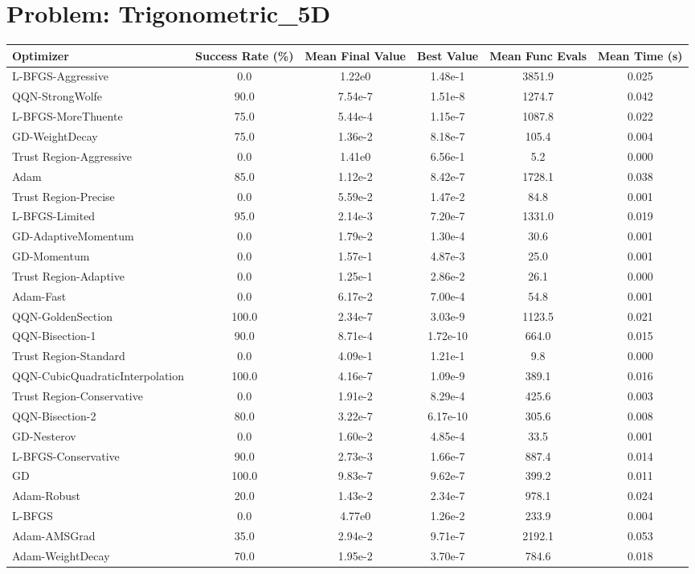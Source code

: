 \documentclass{article}
\begin{document}
\section{Problem: Trigonometric\_5D}
\begin{longtable}{p{3cm}*{5}{c}}
\toprule
\textbf{Optimizer} & \textbf{Success Rate (\%)} & \textbf{Mean Final Value} & \textbf{Best Value} & \textbf{Mean Func Evals} & \textbf{Mean Time (s)} \\
\midrule
L-BFGS-Aggressive & 0.0 & 1.22e0 & 1.48e-1 & 3851.9 & 0.025 \\
QQN-StrongWolfe & 90.0 & 7.54e-7 & 1.51e-8 & 1274.7 & 0.042 \\
L-BFGS-MoreThuente & 75.0 & 5.44e-4 & 1.15e-7 & 1087.8 & 0.022 \\
GD-WeightDecay & 75.0 & 1.36e-2 & 8.18e-7 & 105.4 & 0.004 \\
Trust Region-Aggressive & 0.0 & 1.41e0 & 6.56e-1 & 5.2 & 0.000 \\
Adam & 85.0 & 1.12e-2 & 8.42e-7 & 1728.1 & 0.038 \\
Trust Region-Precise & 0.0 & 5.59e-2 & 1.47e-2 & 84.8 & 0.001 \\
L-BFGS-Limited & 95.0 & 2.14e-3 & 7.20e-7 & 1331.0 & 0.019 \\
GD-AdaptiveMomentum & 0.0 & 1.79e-2 & 1.30e-4 & 30.6 & 0.001 \\
GD-Momentum & 0.0 & 1.57e-1 & 4.87e-3 & 25.0 & 0.001 \\
Trust Region-Adaptive & 0.0 & 1.25e-1 & 2.86e-2 & 26.1 & 0.000 \\
Adam-Fast & 0.0 & 6.17e-2 & 7.00e-4 & 54.8 & 0.001 \\
QQN-GoldenSection & 100.0 & 2.34e-7 & 3.03e-9 & 1123.5 & 0.021 \\
QQN-Bisection-1 & 90.0 & 8.71e-4 & 1.72e-10 & 664.0 & 0.015 \\
Trust Region-Standard & 0.0 & 4.09e-1 & 1.21e-1 & 9.8 & 0.000 \\
QQN-CubicQuadraticInterpolation & 100.0 & 4.16e-7 & 1.09e-9 & 389.1 & 0.016 \\
Trust Region-Conservative & 0.0 & 1.91e-2 & 8.29e-4 & 425.6 & 0.003 \\
QQN-Bisection-2 & 80.0 & 3.22e-7 & 6.17e-10 & 305.6 & 0.008 \\
GD-Nesterov & 0.0 & 1.60e-2 & 4.85e-4 & 33.5 & 0.001 \\
L-BFGS-Conservative & 90.0 & 2.73e-3 & 1.66e-7 & 887.4 & 0.014 \\
GD & 100.0 & 9.83e-7 & 9.62e-7 & 399.2 & 0.011 \\
Adam-Robust & 20.0 & 1.43e-2 & 2.34e-7 & 978.1 & 0.024 \\
L-BFGS & 0.0 & 4.77e0 & 1.26e-2 & 233.9 & 0.004 \\
Adam-AMSGrad & 35.0 & 2.94e-2 & 9.71e-7 & 2192.1 & 0.053 \\
Adam-WeightDecay & 70.0 & 1.95e-2 & 3.70e-7 & 784.6 & 0.018 \\
\bottomrule
\end{longtable}
\end{document}
